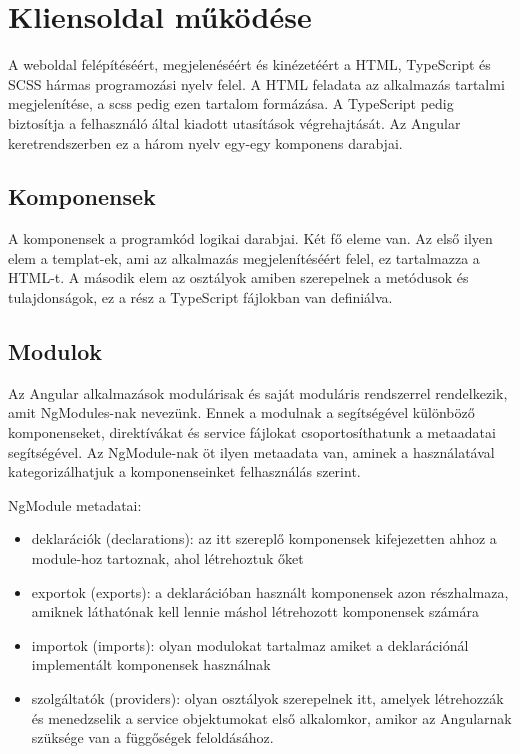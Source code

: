 \section{Kliensoldal működése}
A weboldal felépítéséért, megjelenéséért és kinézetéért a HTML, TypeScript és SCSS hármas programozási nyelv felel. A HTML feladata az alkalmazás tartalmi megjelenítése, a scss pedig ezen tartalom formázása. A TypeScript pedig biztosítja a felhasználó által kiadott utasítások végrehajtását. Az Angular keretrendszerben ez a három nyelv egy-egy komponens darabjai.

\subsection{Komponensek}
A komponensek a programkód logikai darabjai. Két fő eleme van. Az első ilyen elem a templat-ek, ami az alkalmazás megjelenítéséért felel, ez tartalmazza a HTML-t. A második elem az osztályok amiben szerepelnek a metódusok és tulajdonságok, ez a rész a TypeScript fájlokban van definiálva.

\subsection{Modulok}
Az Angular alkalmazások modulárisak és saját moduláris rendszerrel rendelkezik, amit NgModules-nak nevezünk. Ennek a modulnak a segítségével különböző komponenseket, direktívákat és service fájlokat csoportosíthatunk a metaadatai segítségével. Az NgModule-nak öt ilyen metaadata van, aminek a használatával kategorizálhatjuk a komponenseinket felhasználás szerint.

NgModule metadatai:

\begin{itemize}
	\item deklarációk (declarations): az itt szereplő komponensek kifejezetten ahhoz a module-hoz tartoznak, ahol létrehoztuk őket
	\item exportok (exports): a deklarációban használt komponensek azon részhalmaza, amiknek láthatónak kell lennie máshol létrehozott komponensek számára
	\item importok (imports): olyan modulokat tartalmaz amiket a deklarációnál implementált komponensek használnak
	\item szolgáltatók (providers): olyan osztályok szerepelnek itt, amelyek létrehozzák és menedzselik a service objektumokat első alkalomkor, amikor az Angularnak szüksége van a függőségek feloldásához.
\end{itemize}

